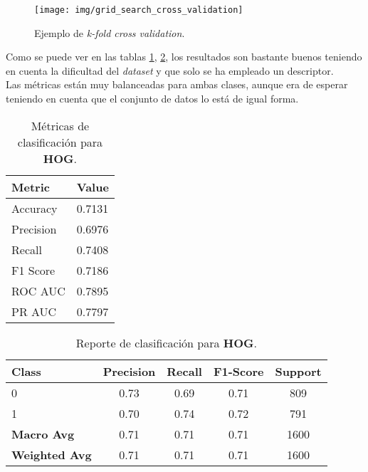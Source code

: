 \documentclass[12pt,letterpaper]{article}
\begin{document}
\begin{figure}[htp]
    \centering
    \texttt{[image: img/grid\_search\_cross\_validation]}
    \caption{Ejemplo de \textit{k-fold cross validation}.}
    \label{fig:kfold}
\end{figure}

Como se puede ver en las tablas \ref{tab:classification_metrics_hog}, \ref{tab:classification_report_hog}, los resultados son bastante buenos teniendo en cuenta la dificultad del \textit{dataset} y que solo se ha empleado un descriptor.\\[6pt]
Las métricas están muy balanceadas para ambas clases, aunque era de esperar teniendo en cuenta que el conjunto de datos lo está de igual forma.

\begin{table}[htp]
    \centering
    \begin{tabular}{ll}
    \hline
    \textbf{Metric} & \textbf{Value} \\
    \hline
    Accuracy    & 0.7131 \\
    Precision   & 0.6976 \\
    Recall      & 0.7408 \\
    F1 Score    & 0.7186 \\
    ROC AUC     & 0.7895 \\
    PR AUC      & 0.7797 \\
    \hline
    \end{tabular}
    \caption{Métricas de clasificación para \textbf{HOG}.}
    \label{tab:classification_metrics_hog}
\end{table}

\begin{table}[htp]
    \centering
    \begin{tabular}{lcccc}
    \hline
    \textbf{Class} & \textbf{Precision} & \textbf{Recall} & \textbf{F1-Score} & \textbf{Support} \\
    \hline
    0 & 0.73 & 0.69 & 0.71 & 809 \\
    1 & 0.70 & 0.74 & 0.72 & 791 \\
    \hline
    \textbf{Macro Avg} & 0.71 & 0.71 & 0.71 & 1600 \\
    \textbf{Weighted Avg} & 0.71 & 0.71 & 0.71 & 1600 \\
    \hline
    \end{tabular}
    \caption{Reporte de clasificación para \textbf{HOG}.}
    \label{tab:classification_report_hog}
\end{table}
\end{document}

